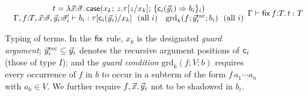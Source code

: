 \begin{figure}[t]
\[\begin{array}{c}
{\begin{array}{c}
     t = \lambda \ensuremath{\vec{x}}{:}\ensuremath{\vec{\sigma}}.\,
         \ensuremath{\mathsf{case}(x_k;\,z.\tau[z/x_k];\,\{\mathsf{c}_i(\vec{y}_i)
         \Rightarrow b_i\}_i)} \\
     \Gamma, f{:}T, \ensuremath{\vec{x}}{:}\ensuremath{\vec{\sigma}}, \ensuremath{\vec{y}}_i{:}\ensuremath{\vec{\sigma}}'_i
       \vdash b_i : \ensuremath{\tau[\mathsf{c}_i(\vec{y}_i)/x_k]}
       \ \ (\text{all } i) \quad
     \mathrm{grd}_k(f; \ensuremath{\vec{y}}_i^{\mathrm{rec}}; b_i) \ \ (\text{all } i)
     \end{array}}
    {\Gamma \vdash \ensuremath{\mathsf{fix}}\,f{:}T.\,t : T}
\end{array}
\]
\caption{Typing of terms.  In the $\mathsf{fix}$ rule, $x_k$ is the designated
  \emph{guard argument}; $\vec{y}_i^{\mathrm{rec}} \subseteq \vec{y}_i$
  denotes the recursive argument positions of $\mathsf{c}_i$ (those of type
  $I$); and the \emph{guard condition}
  $\mathrm{grd}_k(f; V; b)$ requires every occurrence of $f$ in $b$ to
  occur in a subterm of the form $f\,a_1 \cdots a_n$ with $a_k \in V$.
  We further require $f, \vec{x}, \vec{y}_i$ not to be shadowed in $b_i$.}
\label{fig:terms}
\end{figure}

